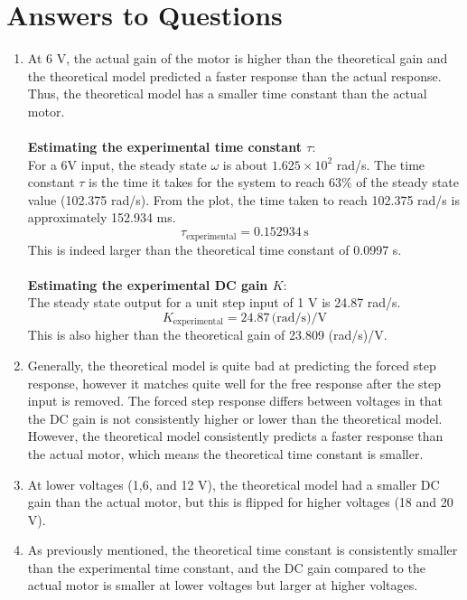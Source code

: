 \documentclass[12pt]{article}
\begin{document}
\section*{Answers to Questions}
\begin{enumerate}
    \item At 6 V, the actual gain of the motor is higher than the theoretical gain and the theoretical model predicted a faster response than the actual response. Thus, the theoretical model has a smaller time constant than the actual motor.\\\\
    \textbf{Estimating the experimental time constant $\tau$}:\\
    For a 6V input, the steady state $\omega$ is about $1.625\times10^2$ rad/s. The time constant $\tau$ is the time it takes for the system to reach $63\%$ of the steady state value (102.375 rad/s). From the plot, the time taken to reach 102.375 rad/s is approximately 152.934 ms.
    \[\boxed{\tau_\text{experimental} = 0.152934 \,\text{s}}\]
    This is indeed larger than the theoretical time constant of 0.0997 s.\\\\
    \textbf{Estimating the experimental DC gain $K$}:\\
    The steady state output for a unit step input of 1 V is 24.87 rad/s. 
    \[\boxed{K_\text{experimental} = 24.87 \,\text{(rad/s)/V}}\]
    This is also higher than the theoretical gain of 23.809 (rad/s)/V.
    \item Generally, the theoretical model is quite bad at predicting the forced step response, however it matches quite well for the free response after the step input is removed. The forced step response differs between voltages in that the DC gain is not consistently higher or lower than the theoretical model. However, the theoretical model consistently predicts a faster response than the actual motor, which means the theoretical time constant is smaller.
    \item At lower voltages (1,6, and 12 V), the theoretical model had a smaller DC gain than the actual motor, but this is flipped for higher voltages (18 and 20 V). 
    \item As previously mentioned, the theoretical time constant is consistently smaller than the experimental time constant, and the DC gain compared to the actual motor is smaller at lower voltages but larger at higher voltages. 
\end{enumerate}
\end{document}
